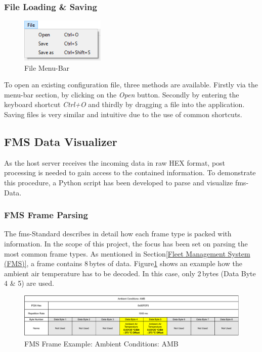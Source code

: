 \subsubsection{File Loading \& Saving}
\begin{figure}
\vspace{-0.6cm}
\includegraphics[width=4.0cm]{images/configuration-tool-file-panel}
\caption{File Menu-Bar}
\end{figure} 
To open an existing configuration file, three methods are available. Firstly via the menu-bar section, by clicking on the \textit{Open} button. Secondly by entering the keyboard shortcut \textit{Ctrl+O} and thirdly by dragging a file into the application. Saving files is very similar and intuitive due to the use of common shortcuts.

\subsection{FMS Data Visualizer}
As the host server receives the incoming data in raw HEX format, post processing is needed to gain access to the contained information. To demonstrate this procedure, a Python script has been developed to parse and visualize \acrshort{fms}-Data. 

\subsubsection{FMS Frame Parsing}
The \acrshort{fms}-Standard describes in detail how each frame type is packed with information. In the scope of this project, the focus has been set on parsing the most common frame types. As mentioned in Section\;\ref{Fleet Management System (FMS)}, a frame contains 8\,bytes of data. Figure\;\ref{fig:fms_frame_example} shows an example how the ambient air temperature has to be decoded. In this case, only 2\,bytes (Data Byte 4 \& 5) are used. 

\begin{figure}[h!]
	\centering
	\includegraphics[width=\textwidth]{images/fms_frame_example}
	\caption{FMS Frame Example: Ambient Conditions: AMB \cite{fms-standard-description}}
	\label{fig:fms_frame_example}
\end{figure}

